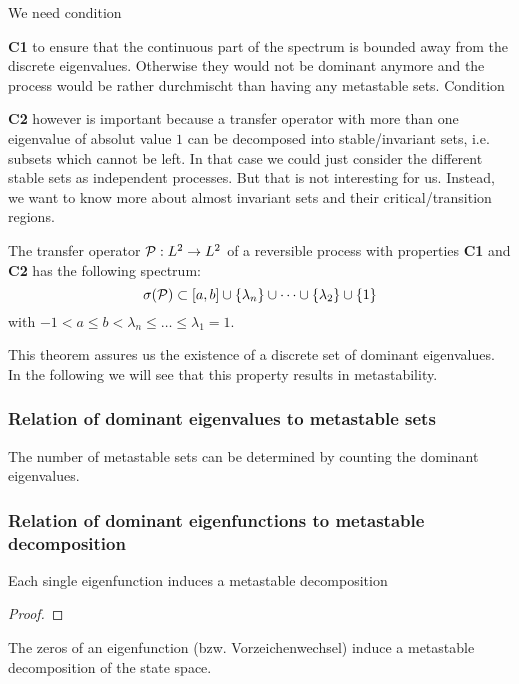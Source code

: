 We need condition {\textbf{\textsf{C1}} to ensure that the continuous part of the spectrum is bounded away from the discrete eigenvalues. Otherwise they would not be dominant anymore and the process would be rather durchmischt than having any metastable sets.
Condition {\textbf{\textsf{C2}} however is important because a transfer operator with more than one eigenvalue of absolut value $1$  can be decomposed into stable/invariant sets, i.e. subsets which cannot be left. In that case we could just consider the different stable sets as independent processes. But that is not interesting for us.  Instead, we want to know more about almost invariant sets and their critical/transition regions. 

\begin{thm}
The transfer operator $\mathcal{P}: L^2 \rightarrow L^2$ of a reversible process with properties \textrm{\textbf{\textsf{C1}}} and \textrm{\textbf{\textsf{C2}}} has the following spectrum:
\begin{equation*}
\sigma(\mathcal{P}) \subset [a,b] \cup \{\lambda_n\} \cup \dots \cup \{\lambda_2 \} \cup \{1\}
\end{equation*}
with $-1 < a \leq b < \lambda_n \leq \dots \leq \lambda_1 = 1$. 
\end{thm}
This theorem assures us the existence of a discrete set of dominant eigenvalues. In the following we will see that this property results in metastability.

\subsubsection*{Relation of dominant eigenvalues to metastable sets}

The number of metastable sets can be determined by counting the dominant eigenvalues.

\subsubsection*{Relation of dominant eigenfunctions to metastable decomposition}
\begin{thm}
Each single eigenfunction induces a metastable decomposition
\end{thm}
\begin{proof}
\end{proof}
The zeros of an eigenfunction (bzw. Vorzeichenwechsel) induce a metastable decomposition of the state space.

}}
